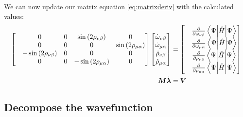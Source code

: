 \documentclass{aux/ttuthes2007}
\newcommand{\sandwich}[3]{\left< #1 \middle\vert #2 \middle\vert #3 \right>}
\newcommand{\s}[1]{\sin\left( #1 \right)}
\newcommand{\pd}[1]{\frac{\partial}{\partial #1}}
\newcommand{\ind}[1]{{\uo #1 \oo #1}}
\newcommand{\uo}[1]{
		\IfEqCase{#1}{
			{0}{\mu}
			{1}{\nu}
			{2}{\xi}
		}[\PackageError{uo}{Undefined option to uo: #1}{}]
}
\newcommand{\oo}[1]{
		\IfEqCase{#1}{
			{0}{\alpha}
			{1}{\beta}
			{2}{\gamma}
		}[\PackageError{unocorb}{Undefined option to unuo: #1}{}]
}
\begin{document}
We can now update our matrix equation \ref{eq:matrixderiv} with the calculated values:
\begin{equation*}
\begin{split}
	\label {eq:matrixrw}
	\begin{bmatrix}
		& 0
		& 0
		& \s {2\rho_\ind 1}
		& 0
		\\
		& 0
		& 0
		& 0
		& \s {2\rho_\ind 0}
		\\
		& -\s {2\rho_\ind 1}
		& 0
		& 0
		& 0
		\\
		& 0
		& 0
		& -\s {2\rho_\ind 0}
		& 0
		\\
	\end{bmatrix}
	\begin{bmatrix}
		\dot \omega_\ind 1 \\
		\dot \omega_\ind 0 \\
		\dot \rho_\ind 1 \\
		\dot \rho_\ind 0 \\
	\end{bmatrix}
	&= 
	\begin{bmatrix}
	&\pd{\omega_\ind 1}\sandwich{\Psi}{\hat H}{\Psi} \\
	&\pd{\omega_\ind 0}\sandwich{\Psi}{\hat H}{\Psi} \\
	&\pd{\rho_\ind 1}\sandwich{\Psi}{\hat H}{\Psi} \\
	&\pd{\rho_\ind 0}\sandwich{\Psi}{\hat H}{\Psi} \\
	\end{bmatrix}\\
	\bm M \dot {\bm \lambda} &= \bm V
\end{split}
\end{equation*}

\subsection {\textbf{Decompose the wavefunction}}
\end{document}
